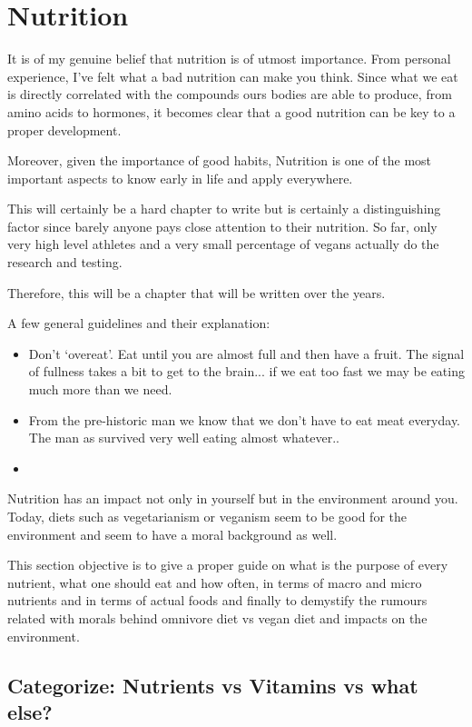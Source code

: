 \section{Nutrition}
It is of my genuine belief that nutrition is of utmost importance. From personal experience, I've felt what a bad nutrition can make you think. Since what we eat is directly correlated with the compounds ours bodies are able to produce, from amino acids to hormones, it becomes clear that a good nutrition can be key to a proper development. 

Moreover, given the importance of good habits, Nutrition is one of the most important aspects to know early in life and apply everywhere.

This will certainly be a hard chapter to write but is certainly a distinguishing factor since barely anyone pays close attention to their nutrition. So far, only very high level athletes and a very small percentage of vegans actually do the research and testing.

Therefore, this will be a chapter that will be written over the years.


A few general guidelines and their explanation:
\begin{itemize}
    \item Don't `overeat'. Eat until you are almost full and then have a fruit. The signal of fullness takes a bit to get to the brain... if we eat too fast we may be eating much more than we need.
    \item From the pre-historic man %
    we know that we don't have to eat meat everyday. The man as survived very well eating almost whatever.. 
    \item 
\end{itemize}

Nutrition has an impact not only in yourself but in the environment around you. 
Today, diets such as vegetarianism or veganism seem to be good for the environment and seem to have a moral background as well.

This section objective is to give a proper guide on what is the purpose of every nutrient, what one should eat and how often, in terms of macro and micro nutrients and in terms of actual foods and finally to demystify the rumours related with morals behind omnivore diet vs vegan diet and impacts on the environment.



\subsection{Categorize: Nutrients vs Vitamins vs what else?}

